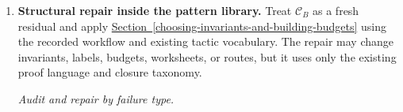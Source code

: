\documentclass[
  11pt,
]{article}
\theoremstyle{definition}
\newcommand{\secref}[1]{\hyperref[#1]{Section~\ref*{#1}}}
\begin{document}
\begin{enumerate}
  \emph{Exit test.} Reverify the finite certificates and every affected
  inequality. Each must hold with its new recorded margin. Update the
  numerical fields in the constant interlock, slack table, invariant
  records, and dependent inequalities; the branch partition, lemma
  statements, payload signatures, and graph topology remain unchanged.
  Otherwise the repair escalates to level 2.
\item
  \textbf{Structural repair inside the pattern library.} Treat
  \(\mathcal C_B\) as a fresh residual and apply
  \secref{choosing-invariants-and-building-budgets} using the recorded workflow and existing
  tactic vocabulary. The repair may change invariants, labels, budgets,
  worksheets, or routes, but it uses only the existing proof language
  and closure taxonomy.

  \emph{Audit and repair by failure type.}


\end{enumerate}
\end{document}
